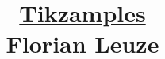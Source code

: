 

\null  %
\nointerlineskip  %
\vfill
\let\snewpage \newpage
\let\newpage \relax
\title{\underline{Tikzamples} \\ $\;$ \\ $\;$ \\ Florian Leuze}
\date{}
\maketitle
\let \newpage \snewpage
\vfill 
\break %

